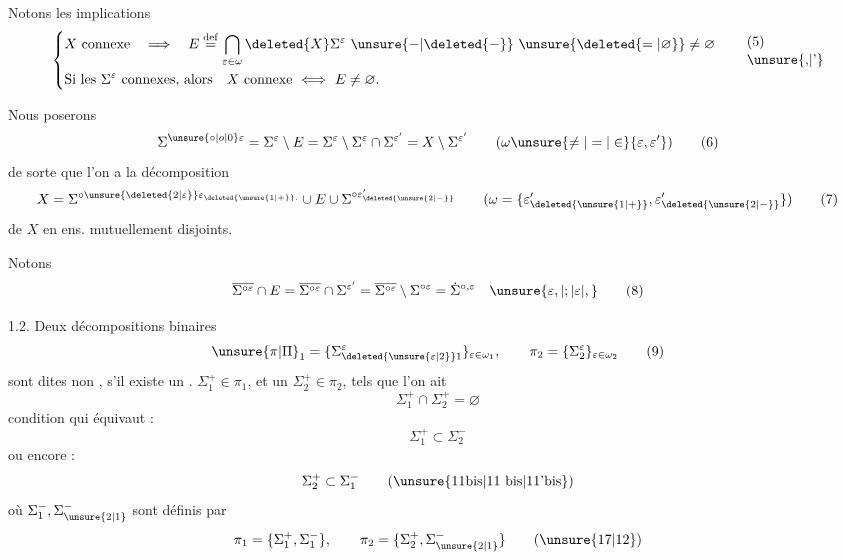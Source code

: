 \begingroup
\makeatletter\tagsleft@true\makeatother
Notons les implications
\[
\left\{\begin{aligned}
&X\ \text{connexe}\quad\Longrightarrow\quad E\overset{\mathrm{def}}{=}\bigcap_{\varepsilon\in\omega}\deleted{X}\Sigma^\varepsilon\ \unsure{-|\deleted{-}}\ \unsure{\deleted{=|\varnothing}}\ne\varnothing\\
&\text{Si les }\Sigma^\varepsilon\ \text{connexes, alors}\quad X\ \text{connexe}\ \Longleftrightarrow\ E\ne\varnothing.
\end{aligned}\right.\tag*{\shortstack[l]{(5)\\\unsure{,|'}}}
\]

Nous poserons
\[
\Sigma^{\unsure{\circ|o|0}\varepsilon}=\Sigma^\varepsilon\setminus E=\Sigma^\varepsilon\setminus\Sigma^\varepsilon\cap\Sigma^{\varepsilon'}=X\setminus\Sigma^{\varepsilon'}\qquad(\omega\unsure{\ne|=|\in}\{\varepsilon,\varepsilon'\})\tag*{(6)}
\]
de sorte que l'on a la décomposition
\[
X=\Sigma^{\circ\unsure{\deleted{2|\varepsilon}}\varepsilon_{\deleted{\unsure{1|+}}.}}\cup E\cup\Sigma^{\circ\varepsilon'_{\deleted{\unsure{2|-}}}}\qquad(\omega=\{\varepsilon'_{\deleted{\unsure{1|+}}},\varepsilon'_{\deleted{\unsure{2|-}}}\})\tag*{(7)}
\]
de $X$ en  ens. mutuellement disjoints.

Notons
\[
\overline{\Sigma^{\circ\varepsilon}}\cap E=\overline{\Sigma^{\circ\varepsilon}}\cap\Sigma^{\varepsilon'}=\overline{\Sigma^{\circ\varepsilon}}\setminus\Sigma^{\circ\varepsilon}=\dot{\Sigma}^{\circ,\varepsilon}\quad\unsure{\varepsilon,|;|\varepsilon|,}\tag*{(8)}
\]

\par
{}

1.2. Deux décompositions binaires
\[
\unsure{\pi|\Pi}_1=\{\Sigma_{\deleted{\unsure{\varepsilon|2}}1}^\varepsilon\}_{\varepsilon\in\omega_1},\qquad\pi_2=\{\Sigma_2^\varepsilon\}_{\varepsilon\in\omega_2}\tag*{(9)}
\]
sont dites non \uline{},  s'il existe un . $\Sigma_1^+\in\pi_1$, et un $\Sigma_2^+\in\pi_2$, tels que l'on ait
\[
\Sigma_1^+\cap\Sigma_2^+=\varnothing\tag*{(10)}
\]
condition qui équivaut :
\[
\Sigma_1^+\subset\Sigma_2^-\tag*{(11)}
\]
ou encore :
\[
\Sigma_2^+\subset\Sigma_1^-\tag*{(\unsure{11bis|11 bis|11'bis})}
\]
où $\Sigma_1^-,\Sigma_{\unsure{2|1}}^-$ sont définis par
\[
\pi_1=\{\Sigma_1^+,\Sigma_1^-\},\qquad\pi_2=\{\Sigma_2^+,\Sigma_{\unsure{2|1}}^-\}\tag*{(\unsure{17|12})}
\]
\endgroup

